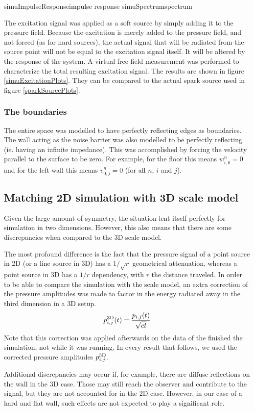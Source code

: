 	{simuImpulseResponse}{impulse response}
	{simuSpectrum}{spectrum}

The excitation signal was applied as a soft 
source\cite{soft-hard-source} by simply adding it to the 
pressure field. Because the excitation is merely added to the pressure 
field, and not forced (as for hard sources), the actual signal that will be 
radiated from the source point will not be equal to the excitation signal 
itself. It will be altered by the response of the system. A virtual free 
field measurement was performed to characterize the total resulting 
excitation signal. The results are shown in figure \ref{simuExcitationPlots}. They can be compared to the actual spark source used in figure \ref{sparkSourcePlots}. 



\subsubsection*{The boundaries}
The entire space was modelled to have perfectly reflecting edges as boundaries. The wall acting as the noise barrier was also modelled to be perfectly reflecting (ie. having an infinite impedance). This was accomplished by forcing the velocity parallel to the surface to be zero. For example, for the floor this means $w_{i,0}^n = 0$ and for the left wall this means $v_{0,j}^n = 0$ (for all $n$, $i$ and $j$).



\subsection{Matching 2D simulation with 3D scale model}
Given the large amount of symmetry, the situation lent itself perfectly for simulation in two dimensions. However, this also means that there are some discrepancies when compared to the 3D scale model.

The most profound difference is the fact that the pressure signal of a point source in 2D (or a line source in 3D) has a $1/\sqrt{r}$ geometrical attenuation, whereas a point source in 3D has a $1/r$ dependency, with $r$ the distance traveled. In order to be able to compare the simulation with the scale model, an extra correction of the pressure amplitudes was made to factor in the energy radiated away in the third dimension in a 3D setup.
$$
p_{i,j}^{\mathrm{3D}}(t) = \frac{p_{i,j}(t)}{\sqrt{ct}}
$$
Note that this correction was applied afterwards on the data of the finished the simulation, not while it was running. In every result that follows, we used the corrected pressure amplitudes $p_{i,j}^{\mathrm{3D}}$.

Additional discrepancies may occur if, for example, there are diffuse reflections on the wall in the 3D case. Those may still reach the observer and contribute to the signal, but they are not accounted for in the 2D case. However, in our case of a hard and flat wall, such effects are not expected to play a significant role.

